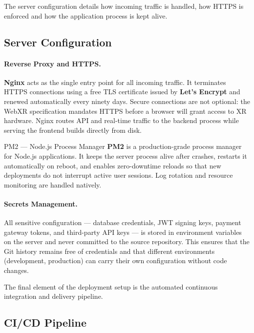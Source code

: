 The server configuration details how incoming traffic is handled, how HTTPS is enforced and how the application process is kept alive.

\subsection{Server Configuration}

\paragraph{Reverse Proxy and HTTPS.}
\textbf{Nginx} acts as the single entry point for all incoming traffic. It terminates
HTTPS connections using a free TLS certificate issued by \textbf{Let's Encrypt} and
renewed automatically every ninety days. Secure connections are not optional: the
WebXR specification mandates HTTPS before a browser will grant access to XR hardware.
Nginx routes API and real-time traffic to the backend process while serving the
frontend builds directly from disk.

\vspace{4pt}
\begin{conceptbox}[aiGreen]{PM2 — Node.js Process Manager}
\textbf{PM2} is a production-grade process manager for Node.js applications. It keeps
the server process alive after crashes, restarts it automatically on reboot, and enables
zero-downtime reloads so that new deployments do not interrupt active user sessions.
Log rotation and resource monitoring are handled natively.
\end{conceptbox}

\paragraph{Secrets Management.}
All sensitive configuration — database credentials, JWT signing keys, payment gateway
tokens, and third-party API keys — is stored in environment variables on the server and
never committed to the source repository. This ensures that the Git history remains free
of credentials and that different environments (development, production) can carry their
own configuration without code changes.

The final element of the deployment setup is the automated continuous integration and delivery pipeline.

\subsection{CI/CD Pipeline}

